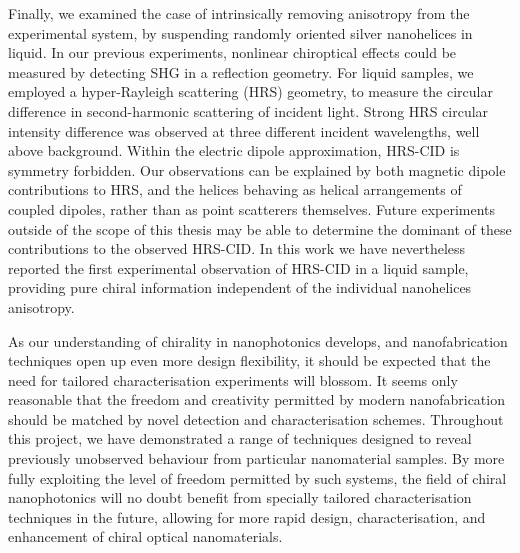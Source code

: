 Finally, we examined the case of intrinsically removing anisotropy from the experimental system, by suspending randomly oriented silver nanohelices in liquid. In our previous experiments, nonlinear chiroptical effects could be measured by detecting SHG in a reflection geometry. For liquid samples, we employed a hyper-Rayleigh scattering (HRS) geometry, to measure the circular difference in second-harmonic scattering of incident light. Strong HRS circular intensity difference was observed at three different incident wavelengths, well above background. Within the electric dipole approximation, HRS-CID is symmetry forbidden. Our observations can be explained by both magnetic dipole contributions to HRS, and the helices behaving as helical arrangements of coupled dipoles, rather than as point scatterers themselves. Future experiments outside of the scope of this thesis may be able to determine the dominant of these contributions to the observed HRS-CID. In this work we have nevertheless reported the first experimental observation of HRS-CID in a liquid sample, providing pure chiral information independent of the individual nanohelices anisotropy.

As our understanding of chirality in nanophotonics develops, and nanofabrication techniques open up even more design flexibility, it should be expected that the need for tailored characterisation experiments will blossom. It seems only reasonable that the freedom and creativity permitted by modern nanofabrication should be matched by novel detection and characterisation schemes. Throughout this project, we have demonstrated a range of techniques designed to reveal previously unobserved behaviour from particular nanomaterial samples. By more fully exploiting the level of freedom permitted by such systems, the field of chiral nanophotonics will no doubt benefit from specially tailored characterisation techniques in the future, allowing for more rapid design, characterisation, and enhancement of chiral optical nanomaterials.
